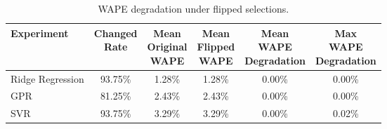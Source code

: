\begin{table}[!ht]
	\centering
	\caption{\centering WAPE degradation under flipped selections.}
	\begin{tabular}{lccccc}
		\toprule
		Experiment       &
		\shortstack{Changed                                            \\Rate} &
		\shortstack{Mean                                               \\Original\\WAPE} &
		\shortstack{Mean                                               \\Flipped\\WAPE} &
		\shortstack{Mean                                               \\WAPE\\Degradation} &
		\shortstack{Max                                                \\WAPE\\Degradation} \\
		\midrule
		Ridge Regression & 93.75\% & 1.28\% & 1.28\% & 0.00\% & 0.00\% \\
		GPR              & 81.25\% & 2.43\% & 2.43\% & 0.00\% & 0.00\% \\
		SVR              & 93.75\% & 3.29\% & 3.29\% & 0.00\% & 0.02\% \\
		\bottomrule
	\end{tabular}
	\label{tab:complexity_ordering_robustness}
\end{table}
